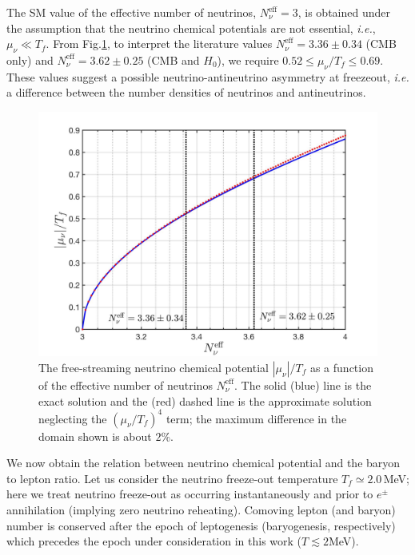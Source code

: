The SM value of the effective number of neutrinos, $N_\nu^{\mathrm{eff}}=3$, is obtained under the assumption that the neutrino chemical potentials are not essential, {\it i.e.\/}, $\mu_\nu\ll T_f$. From Fig.\;\ref{Chemical_Potential_Neff}, to interpret the literature values $N_\nu^{\mathrm{eff}}=3.36\pm0.34$ (CMB only) and $N_\nu^{\mathrm{eff}}= 3.62\pm0.25$ (CMB and $H_0$), we require $0.52\leqslant\mu_\nu/T_f\leqslant0.69$. These values suggest  a possible neutrino-antineutrino asymmetry at freezeout, {\it i.e.\/} a difference between the number densities of neutrinos and antineutrinos.

\begin{figure}[t]
\begin{center}
\includegraphics[width=\textwidth]{./plots/Chemical_Potential_Neff}
\caption{The free-streaming neutrino chemical potential $|\mu_\nu|/T_f$ as a function of the effective number of neutrinos $N_\nu^{\mathrm{eff}}$. The solid (blue) line is the exact solution and the (red) dashed line is the approximate solution neglecting the $(\mu_\nu/T_f)^4$ term; the maximum difference in the domain shown is about $2\%$. }
\label{Chemical_Potential_Neff}
\end{center}
\end{figure}



We now obtain the relation between neutrino chemical potential and the baryon to lepton ratio. Let us consider the neutrino freeze-out temperature $T_f\simeq 2.0$\,MeV; here we treat neutrino freeze-out as occurring instantaneously and prior to $e^\pm$ annihilation (implying zero neutrino reheating). Comoving lepton (and baryon) number is conserved after the epoch of leptogenesis (baryogenesis, respectively) which precedes the epoch  under consideration in this work ($T\lesssim 2$\;MeV). %


